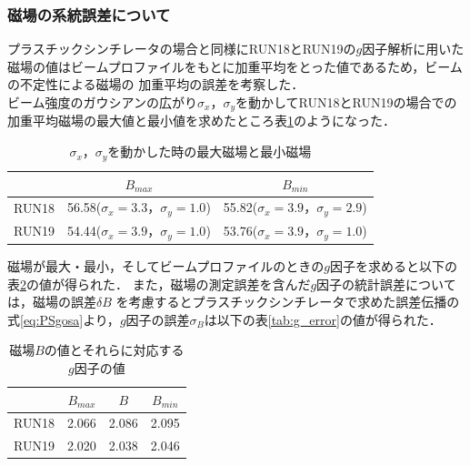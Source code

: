 
\subsubsection{磁場の系統誤差について}

プラスチックシンチレータの場合と同様にRUN18とRUN19の$g$因子解析に用いた磁場の値はビームプロファイルをもとに加重平均をとった値であるため，ビームの不定性による磁場の
加重平均の誤差を考察した．\\
ビーム強度のガウシアンの広がり$\sigma_{x}，\sigma_{y}$を動かしてRUN18とRUN19の場合での加重平均磁場の最大値と最小値を求めたところ表\ref{tab:mag_max_min}のようになった．

\begin{table}[H]
  \caption{$\sigma_{x}，\sigma_{y}$を動かした時の最大磁場と最小磁場}
  \centering
  \begin{tabular}{ccc}\toprule%
         & $B_{max}$ &  $B_{min}$   \\ \midrule
    RUN18 & 56.58\;($\sigma_{x}=3.3，\sigma_{y}=1.0$) & 55.82\;($\sigma_{x}=3.9，\sigma_{y}=2.9$)  \\
         RUN19 & 54.44\;($\sigma_{x}=3.9，\sigma_{y}=1.0$) & 53.76\;($\sigma_{x}=3.9，\sigma_{y}=1.0$) \\ \bottomrule
  \end{tabular}
  \label{tab:mag_max_min}
\end{table}

磁場が最大・最小，そしてビームプロファイルのときの$g$因子を求めると以下の表\ref{tab:mag_g}の値が得られた．
また，磁場の測定誤差を含んだ$g$因子の統計誤差については，磁場の誤差$\delta B$
を考慮するとプラスチックシンチレータで求めた誤差伝播の式\ref{eq:PSgosa}より，$g$因子の誤差$\sigma_{B}$は以下の表\ref{tab:g_error}の値が得られた．

\begin{table}[H]
  \caption{磁場$B$の値とそれらに対応する$g$因子の値}
  \centering
  \begin{tabular}{cccc}\toprule%
    & $B_{max}$ & $B$ & $B_{min}$  \\ \midrule
    RUN18 & 2.066 & 2.086 & 2.095 \\
    RUN19 & 2.020 & 2.038 & 2.046 \\ \bottomrule
  \end{tabular}
  \label{tab:mag_g}
\end{table}

